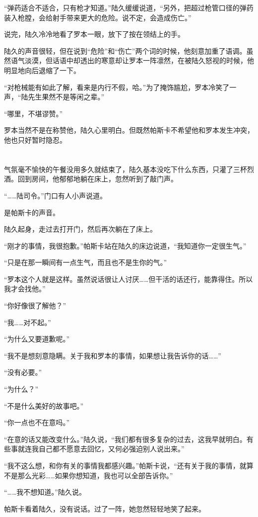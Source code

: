 “弹药适合不适合，只有枪才知道。”陆久缓缓说道，“另外，把超过枪管口径的弹药装入枪膛，会给射手带来更大的危险。说不定，会造成伤亡。”

说完，陆久冷冷地看了罗本一眼，放下了按在领结上的手。

陆久的声音很轻，但在说到“危险”和“伤亡”两个词的时候，他刻意加重了语调。虽然语气淡漠，但话语中却透出的寒意却让罗本一阵凛然，在被陆久怒视的时候，他明显地向后退缩了一下。

“对枪械能有如此了解，看来是内行不假，哈。”为了掩饰尴尬，罗本冷笑了一声，“陆先生果然不是等闲之辈。”

“哪里，不堪谬赞。”

罗本当然不是在称赞他，陆久心里明白。但既然帕斯卡不希望他和罗本发生冲突，他也只好暂时隐忍。\section*{}

气氛毫不愉快的午餐没用多久就结束了，陆久基本没吃下什么东西，只灌了三杯烈酒。回到房间，他郁郁地躺在床上，忽然听到了敲门声。

“……陆司令。”门口有人小声说道。

是帕斯卡的声音。

陆久起身，走过去打开门，然后再次躺在了床上。

“刚才的事情，我很抱歉。”帕斯卡站在陆久的床边说道，“我知道你一定很生气。”

“只是在那一瞬间有一点生气，而且也不是生你的气。”

“罗本这个人就是这样。虽然说话很让人讨厌……但干活的话还行，能靠得住。所以我才会找他。”

“你好像很了解他？”

“我……对不起。”

“为什么又要道歉呢。”

“我不是想刻意隐瞒。关于我和罗本的事情，如果想让我告诉你的话……”

“没有必要。”

“为什么？”

“不是什么美好的故事吧。”

“你一点也不在意吗。”

“在意的话又能改变什么。”陆久说，“我们都有很多复杂的过去，这我早就明白。有些事就连我自己都不愿意去回忆，又何必强迫别人说出来。”

“我不这么想，和你有关的事情我都感兴趣。”帕斯卡说，“还有关于我的事情，就算不是那么光彩……如果你想知道，我也可以全部告诉你。”

“……我不想知道。”陆久说。

帕斯卡看着陆久，没有说话。过了一阵，她忽然轻轻地笑了起来。

